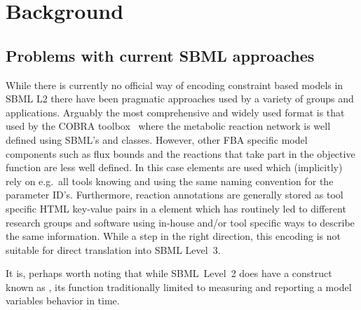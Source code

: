 
\section{Background}
\label{background}

\subsection{Problems with current SBML approaches}

While there is currently no official way of encoding constraint based models
in SBML L2 there have been pragmatic approaches used by a variety of groups
and applications. Arguably the most comprehensive and widely used format is
that used by the \textsf{COBRA toolbox}~\citep{cobra} where the metabolic
reaction network is well defined using SBML's \Reaction and \Species
classes. However, other FBA specific model components such as flux bounds
and the reactions that take part in the objective function are less well
defined. In this case \LocalParameter elements are used which (implicitly)
rely on e.g.~all tools knowing and using the same naming convention for the
parameter ID's. Furthermore, reaction annotations are generally stored as
tool specific HTML key-value pairs in a \Notes element which has routinely
led to different research groups and software using in-house and/or tool
specific ways to describe the same information.
%
%
While a step in the right direction, this encoding is not suitable for
direct translation into SBML Level~3.

It is, perhaps  worth noting that while SBML~Level~2 does have a construct known as \Constraint, its function traditionally limited to measuring and reporting a model variables behavior in time. 
%

